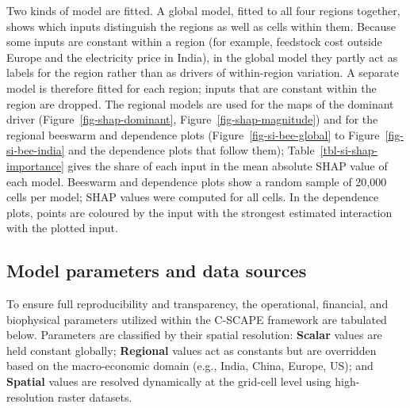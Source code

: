 \documentclass[
  letterpaper,
]{article}
\begin{document}
Two kinds of model are fitted. A global model, fitted to all four
regions together, shows which inputs distinguish the regions as well as
cells within them. Because some inputs are constant within a region (for
example, feedstock cost outside Europe and the electricity price in
India), in the global model they partly act as labels for the region
rather than as drivers of within-region variation. A separate model is
therefore fitted for each region; inputs that are constant within the
region are dropped. The regional models are used for the maps of the
dominant driver (Figure~\ref{fig-shap-dominant},
Figure~\ref{fig-shap-magnitude}) and for the regional beeswarm and
dependence plots (Figure~\ref{fig-si-bee-global} to
Figure~\ref{fig-si-bee-india} and the dependence plots that follow
them); Table~\ref{tbl-si-shap-importance} gives the share of each input
in the mean absolute SHAP value of each model. Beeswarm and dependence
plots show a random sample of 20,000 cells per model; SHAP values were
computed for all cells. In the dependence plots, points are coloured by
the input with the strongest estimated interaction with the plotted
input.

\subsection{Model parameters and data
sources}\label{model-parameters-and-data-sources}

To ensure full reproducibility and transparency, the operational,
financial, and biophysical parameters utilized within the C-SCAPE
framework are tabulated below. Parameters are classified by their
spatial resolution: \textbf{Scalar} values are held constant globally;
\textbf{Regional} values act as constants but are overridden based on
the macro-economic domain (e.g., India, China, Europe, US); and
\textbf{Spatial} values are resolved dynamically at the grid-cell level
using high-resolution raster datasets.

\begingroup
\fontsize{7.0pt}{8.0pt}\selectfont
\end{document}
